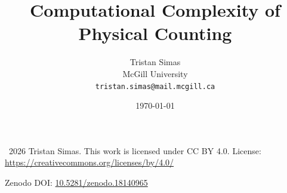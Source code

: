 \documentclass[11pt]{article}
\title{Computational Complexity of Physical Counting}
\author{
  Tristan Simas\\
  McGill University\\
  \texttt{tristan.simas@mail.mcgill.ca}
}
\date{\today}
\begin{document}
\maketitle

\begingroup
\footnotesize
\noindent\textcopyright\ 2026 Tristan Simas.
This work is licensed under CC BY 4.0.
License: \url{https://creativecommons.org/licenses/by/4.0/}
\par
\noindent Zenodo DOI: \href{https://doi.org/10.5281/zenodo.18140965}{10.5281/zenodo.18140965}
\par
\endgroup

\begin{abstract}

\end{abstract}



















\end{document}
